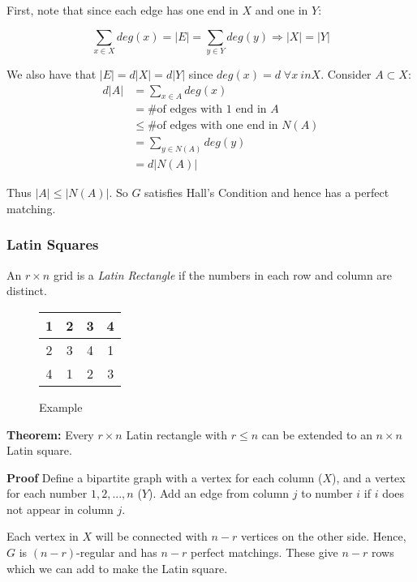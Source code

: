 \documentclass[11pt, letterpaper, oneside]{article}
\begin{document}
First, note that since each edge has one end in $X$ and one in $Y$:

$$ \sum_{x \in X} deg(x) = |E| = \sum_{y \in Y}  deg(y) \Rightarrow |X|=|Y| $$

We also have that $|E| = d|X| = d|Y|$ since $deg(x)=d \; \forall x \ in X$. Consider $A \subset X$:
\begin{align*}
	d|A| &=\sum_{x \in A} deg(x) \\
		 &= \text{\# of edges with 1 end in } A \\
		 &\leq \text{\# of edges with one end in } N(A) \\
		 &= \sum_{y \in N(A)} deg(y) \\
		 &= d|N(A)|
\end{align*}

Thus $|A| \leq |N(A)|$. So $G$ satisfies Hall's Condition and hence has a perfect matching.

\subsubsection*{Latin Squares}
An $r \times n$ grid is a \textit{Latin Rectangle} if the numbers in each row and column are distinct.

\begin{wrapfigure}{r}{0.15\textwidth}
	\caption*{Example}
	\begin{tabular}{|c|c|c|c|}
		\hline 1 & 2 & 3 & 4 \\ 
		\hline 2 & 3 & 4 & 1 \\ 
		\hline 4 & 1 & 2 & 3 \\ 
		\hline 
	\end{tabular}
\end{wrapfigure}

\textbf{Theorem:} Every $r \times n$ Latin rectangle with $r \leq n$ can be extended to an $n \times n$ Latin square.

\textbf{Proof} Define a bipartite graph with a vertex for each column ($X$), and a vertex for each number $1, 2, ..., n$ ($Y$). Add an edge from column $j$ to number $i$ if $i$ does not appear in column $j$.

Each vertex in $X$ will be connected with $n-r$ vertices on the other side. Hence, $G$ is $(n-r)$-regular and has $n-r$ perfect matchings. These give $n-r$ rows which we can add to make the Latin square.
\end{document}
